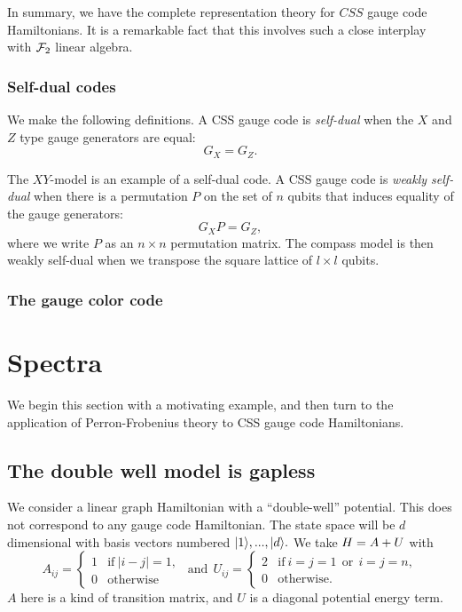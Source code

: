 \documentclass[12pt]{article}
\begin{document}
In summary, we have the
complete representation
theory for $CSS$ gauge code Hamiltonians.
It is a remarkable fact that this involves such
a close interplay with $\mathcal{F}_2$ linear algebra.

\subsubsection{Self-dual codes}

We make the following definitions.
A CSS gauge code is \emph{self-dual} when the $X$ and $Z$ type
gauge generators are equal: $$G_X = G_Z.$$

The $XY$-model is an example of a self-dual code.
A CSS gauge code is \emph{weakly self-dual}
when there is a permutation $P$ on the set of $n$ qubits
that induces equality of the gauge generators:
$$
    G_X P = G_Z,
$$
where we write $P$ as an $n\times n$ permutation matrix.
The compass model is then weakly self-dual when we transpose
the square lattice of $l\times l$ qubits.


\subsubsection{The gauge color code}

%


\section{Spectra}
\label{spectra}

We begin this section with a motivating example,
and then turn to the application of
Perron-Frobenius theory to
CSS gauge code Hamiltonians.

\subsection{The double well model is gapless}

We consider a linear graph Hamiltonian
with a ``double-well'' potential.
This does not correspond to any gauge code Hamiltonian.
The state space will be $d$ dimensional with
basis vectors numbered $|{1}\rangle,...,|{d}\rangle.$
We take
$ H = A + U $
with
$$
A_{ij} = \left\{ \begin{array}{ll}
     1 &\mbox{if}\  |i-j|=1,  \\
     0 &\mbox{otherwise}\end{array}\right.
\ \ \mbox{and}\ \ 
U_{ij} =  \left\{ \begin{array}{ll}
     2 &\mbox{if}\  i=j=1 \ \ \mbox{or}\ \  i=j=n, \\
     0 &\mbox{otherwise.}\end{array}\right.
$$
$A$ here is a kind of transition matrix,
and $U$ is a diagonal potential energy term.
\end{document}
